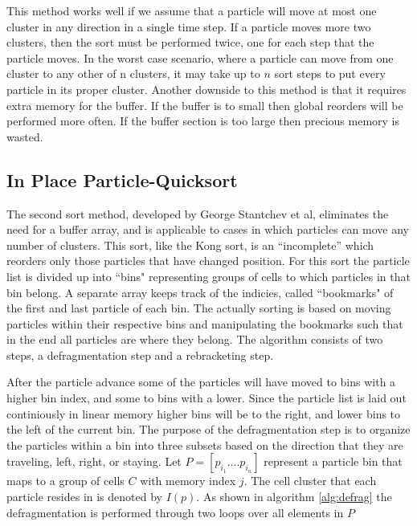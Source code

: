 	This method works well if we assume that a particle will move at most one cluster in any direction in a single time step. If a particle moves more two clusters, then the sort must be performed twice, one for each step that the particle moves. In the worst case scenario, where a particle can move from one cluster to any other of n clusters, it may take up to $n$ sort steps to put every particle in its proper cluster. Another downside to this method is that it requires extra memory for the buffer. If the buffer is to small then global reorders will be performed more often. If the buffer section is too large then precious memory is wasted. 

	\subsection{In Place Particle-Quicksort}
	The second sort method, developed by George Stantchev et al, eliminates the need for a buffer array, and is applicable to cases in which particles can move any number of clusters. This sort, like the Kong sort, is an ``incomplete'' which reorders only those particles that have changed position. For this sort the particle list is divided up into ``bins" representing groups of cells to which particles in that bin belong. A separate array keeps track of the indicies, called ``bookmarks" of the first and last particle of each bin. The actually sorting is based on moving particles within their respective bins and manipulating the bookmarks such that in the end all particles are where they belong. The algorithm consists of two steps, a defragmentation step and a rebracketing step. 
	
	After the particle advance some of the particles will have moved to bins with a higher bin index, and some to bins with a lower. Since the particle list is laid out continiously in linear memory higher bins will be to the right, and lower bins to the left of the current bin. The purpose of the defragmentation step is to organize the particles within a bin into three subsets based on the direction that they are traveling, left, right, or staying. Let $P = [p_{i_1}.... p_{i_n}]$ represent a particle bin that maps to a group of cells $C$ with memory index $j$. The cell cluster that each particle resides in is denoted by $I(p)$. As shown in algorithm \ref{alg:defrag} the defragmentation is performed through two loops over all elements in $P$

